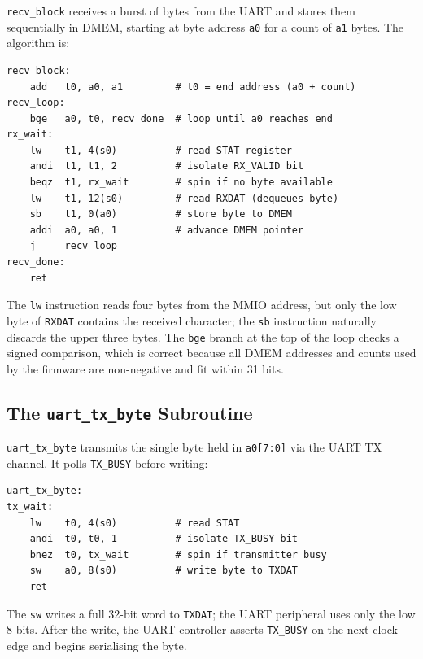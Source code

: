 \texttt{recv\_block} receives a burst of bytes from the UART and stores them
sequentially in DMEM, starting at byte address \texttt{a0} for a count of \texttt{a1}
bytes. The algorithm is:

\begin{lstlisting}[language=RISCV, caption={recv\_block: receive a1 bytes from UART into DMEM at address a0}]
recv_block:
    add   t0, a0, a1         # t0 = end address (a0 + count)
recv_loop:
    bge   a0, t0, recv_done  # loop until a0 reaches end
rx_wait:
    lw    t1, 4(s0)          # read STAT register
    andi  t1, t1, 2          # isolate RX_VALID bit
    beqz  t1, rx_wait        # spin if no byte available
    lw    t1, 12(s0)         # read RXDAT (dequeues byte)
    sb    t1, 0(a0)          # store byte to DMEM
    addi  a0, a0, 1          # advance DMEM pointer
    j     recv_loop
recv_done:
    ret
\end{lstlisting}

The \texttt{lw} instruction reads four bytes from the MMIO address, but only the
low byte of \texttt{RXDAT} contains the received character; the \texttt{sb} instruction
naturally discards the upper three bytes. The \texttt{bge} branch at the top of the
loop checks a signed comparison, which is correct because all DMEM addresses and counts
used by the firmware are non-negative and fit within 31 bits.

\subsection{The \texttt{uart\_tx\_byte} Subroutine}

\texttt{uart\_tx\_byte} transmits the single byte held in \texttt{a0[7:0]} via the
UART TX channel. It polls \texttt{TX\_BUSY} before writing:

\begin{lstlisting}[language=RISCV, caption={uart\_tx\_byte: transmit one byte (a0[7:0]) via UART}]
uart_tx_byte:
tx_wait:
    lw    t0, 4(s0)          # read STAT
    andi  t0, t0, 1          # isolate TX_BUSY bit
    bnez  t0, tx_wait        # spin if transmitter busy
    sw    a0, 8(s0)          # write byte to TXDAT
    ret
\end{lstlisting}

The \texttt{sw} writes a full 32-bit word to \texttt{TXDAT}; the UART peripheral uses
only the low 8 bits. After the write, the UART controller asserts \texttt{TX\_BUSY}
on the next clock edge and begins serialising the byte.

